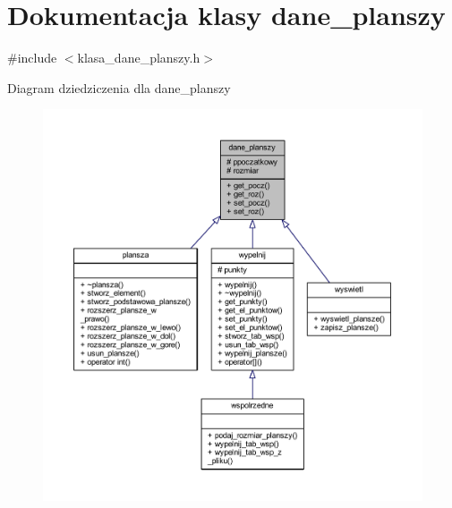 \hypertarget{classdane__planszy}{}\section{Dokumentacja klasy dane\+\_\+planszy}
\label{classdane__planszy}


{\ttfamily \#include $<$klasa\+\_\+dane\+\_\+planszy.\+h$>$}



Diagram dziedziczenia dla dane\+\_\+planszy
\nopagebreak
\begin{figure}[H]
\begin{center}
\leavevmode
\includegraphics[width=350pt]{classdane__planszy__inherit__graph}
\end{center}
\end{figure}


